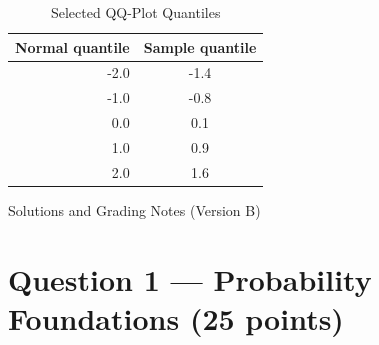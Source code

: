 \documentclass[11pt]{article}
\begin{document}
\begin{table}[h]
\centering
\caption{Selected QQ-Plot Quantiles}\label{tab:b-qq-sol}
\begin{tabular}{@{}rc@{}}
\toprule
\textbf{Normal quantile} & \textbf{Sample quantile}\\
\midrule
-2.0 & -1.4 \\
-1.0 & -0.8 \\
 0.0 &  0.1 \\
 1.0 &  0.9 \\
 2.0 &  1.6 \\
\bottomrule
\end{tabular}
\end{table}

\newpage

\begin{center}
{\LARGE Solutions and Grading Notes (Version B)}\\[0.5em]
\end{center}

\section*{Question 1 — Probability Foundations (25 points)}
\end{document}

